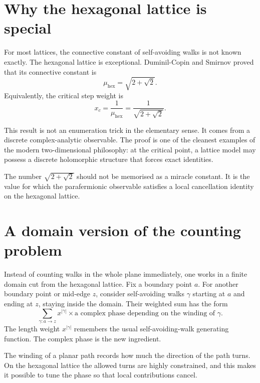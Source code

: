 
\section{Why the hexagonal lattice is special}

For most lattices, the connective constant of self-avoiding walks is not known exactly.  The hexagonal lattice is exceptional.  Duminil-Copin and Smirnov proved that its connective constant is
\[
  \mu_{\mathrm{hex}}=\sqrt{2+\sqrt2}.
\]
Equivalently, the critical step weight is
\[
  x_c=\frac1{\mu_{\mathrm{hex}}}=\frac1{\sqrt{2+\sqrt2}}.
\]

This result is not an enumeration trick in the elementary sense.  It comes from a discrete complex-analytic observable.  The proof is one of the cleanest examples of the modern two-dimensional philosophy: at the critical point, a lattice model may possess a discrete holomorphic structure that forces exact identities.

\begin{remark}
The number \(\sqrt{2+\sqrt2}\) should not be memorised as a miracle constant.  It is the value for which the parafermionic observable satisfies a local cancellation identity on the hexagonal lattice.
\end{remark}

\section{A domain version of the counting problem}

Instead of counting walks in the whole plane immediately, one works in a finite domain cut from the hexagonal lattice.  Fix a boundary point \(a\).  For another boundary point or mid-edge \(z\), consider self-avoiding walks \(\gamma\) starting at \(a\) and ending at \(z\), staying inside the domain.  Their weighted sum has the form
\[
  \sum_{\gamma:a\to z} x^{|\gamma|} \times \text{a complex phase depending on the winding of }\gamma.
\]
The length weight \(x^{|\gamma|}\) remembers the usual self-avoiding-walk generating function.  The complex phase is the new ingredient.

The winding of a planar path records how much the direction of the path turns.  On the hexagonal lattice the allowed turns are highly constrained, and this makes it possible to tune the phase so that local contributions cancel.


